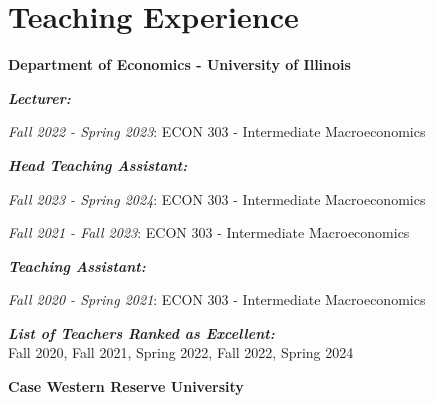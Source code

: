 \documentclass[letterpaper,11pt]{article}
\begin{document}
\section{Teaching Experience}
\begin{adjustwidth}{3mm}{0mm}
\textbf{Department of Economics - University of Illinois}
\end{adjustwidth}

\begin{adjustwidth}{6mm}{0mm}
  \textbf{\textit{Lecturer:}}
\end{adjustwidth}

\begin{adjustwidth}{9mm}{0mm}
  \textit{Fall 2022 - Spring 2023}: ECON 303 - Intermediate Macroeconomics
\end{adjustwidth}

\begin{adjustwidth}{6mm}{0mm}
  \textbf{\textit{Head Teaching Assistant:}}
\end{adjustwidth}

\begin{adjustwidth}{9mm}{0mm}
  \textit{Fall 2023 - Spring 2024}: ECON 303 - Intermediate Macroeconomics
\end{adjustwidth}

\begin{adjustwidth}{9mm}{0mm}
  \textit{Fall 2021 - Fall 2023}: ECON 303 - Intermediate Macroeconomics
\end{adjustwidth}

\begin{adjustwidth}{6mm}{0mm}
  \textbf{\textit{Teaching Assistant:}}
\end{adjustwidth}

\begin{adjustwidth}{9mm}{0mm}
  \textit{Fall 2020 - Spring 2021}: ECON 303 - Intermediate Macroeconomics
\end{adjustwidth}
\vspace{2mm}
\begin{adjustwidth}{3mm}{0mm}
  \textbf{\textit{List of Teachers Ranked as Excellent:}}
  \\
  Fall 2020, Fall 2021, Spring 2022, Fall 2022, Spring 2024
\end{adjustwidth}

\vspace{2mm}

\begin{adjustwidth}{3mm}{0mm}
  \textbf{Case Western Reserve University}
\end{adjustwidth}
\end{document}
